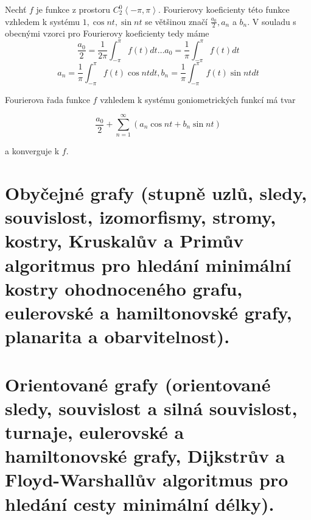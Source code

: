 \documentclass[a4paper, 11pt]{report}
\newtheorem{veta}{Věta}[chapter]
\begin{document}
Nechť $f$ je funkce z prostoru $C_2^0\left<-\pi, \pi\right>$. Fourierovy koeficienty této funkce vzhledem k systému $1, \cos nt, \sin nt$ se většinou značí $\frac{a_0}{2}, a_n$ a $b_n$.
V souladu s obecnými vzorci pro Fourierovy koeficienty tedy máme
$$\frac{a_0}{2} = \frac{1}{2 \pi} \int_{-\pi}^\pi f(t) dt \dots a_0 = \frac{1}{\pi} \int_{-\pi}^\pi f(t) dt$$
$$a_n = \frac{1}{\pi} \int_{-\pi}^\pi f(t) \cos nt dt, b_n = \frac{1}{\pi} \int_{-\pi}^\pi f(t) \sin nt dt$$

Fourierova řada funkce $f$ vzhledem k systému goniometrických funkcí má tvar

$$\frac{a_0}{2} + \sum\limits_{n=1}^\infty (a_n \cos nt + b_n \sin nt)$$

a konverguje k $f$.

\begin{comment}
\section{Úplné unitární prostoru. Rieszova-Fischerova věta}

\begin{veta}
(Riesz-Fischer). Nechť $\{\varphi_n\}$ je libovolný ortonormální systém v úplném unitárním prostoru R a nechť čísla $c_1, c_2, \dots, c_n, \dots$ jsou taková, že řada
$$\sum\limits_{k=1}^\infty c_k^2$$
konverguje. Potom existuje takový prvek $f \in R$, že $c_k = (f, \varphi_k)$ a
$$\sum\limits_{k=1}^\infty (f, f) = ||f||^2$$
\end{comment}




















\chapter{Obyčejné grafy (stupně uzlů, sledy, souvislost, izomorfismy, stromy, kostry, Kruskalův a Primův algoritmus pro hledání minimální kostry ohodnoceného grafu, eulerovské a hamiltonovské grafy, planarita a obarvitelnost).} \label{cha:14}
\chapter{Orientované grafy (orientované sledy, souvislost a silná souvislost, turnaje, eulerovské a hamiltonovské grafy, Dijkstrův a Floyd-Warshallův algoritmus pro hledání cesty minimální délky).} \label{cha:15}
\end{document}
